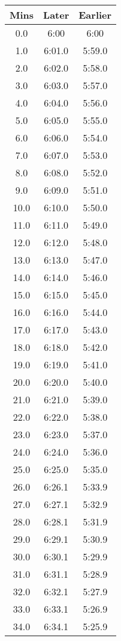 \begin{footnotesize}
	\begin{minipage}{0.25\textwidth}	
\begin{tabular}[t]{c|c|c}
	Mins&Later&Earlier\\\hline
	0.0&6:00&6:00\\\hline
	1.0&6:01.0&5:59.0\\\hline
	2.0&6:02.0&5:58.0\\\hline
	3.0&6:03.0&5:57.0\\\hline
	4.0&6:04.0&5:56.0\\\hline
	5.0&6:05.0&5:55.0\\\hline
	6.0&6:06.0&5:54.0\\\hline
	7.0&6:07.0&5:53.0\\\hline
	8.0&6:08.0&5:52.0\\\hline
	9.0&6:09.0&5:51.0\\\hline
	10.0&6:10.0&5:50.0\\\hline
	11.0&6:11.0&5:49.0\\\hline
	12.0&6:12.0&5:48.0\\\hline
	13.0&6:13.0&5:47.0\\\hline
	14.0&6:14.0&5:46.0\\\hline
	15.0&6:15.0&5:45.0\\\hline
	16.0&6:16.0&5:44.0\\\hline
	17.0&6:17.0&5:43.0\\\hline
	18.0&6:18.0&5:42.0\\\hline
	19.0&6:19.0&5:41.0\\\hline
	20.0&6:20.0&5:40.0\\\hline
	21.0&6:21.0&5:39.0\\\hline
	22.0&6:22.0&5:38.0\\\hline
	23.0&6:23.0&5:37.0\\\hline
	24.0&6:24.0&5:36.0\\\hline
	25.0&6:25.0&5:35.0\\\hline
	26.0&6:26.1&5:33.9\\\hline
	27.0&6:27.1&5:32.9\\\hline
	28.0&6:28.1&5:31.9\\\hline
	29.0&6:29.1&5:30.9\\\hline
	30.0&6:30.1&5:29.9\\\hline
	31.0&6:31.1&5:28.9\\\hline
	32.0&6:32.1&5:27.9\\\hline
	33.0&6:33.1&5:26.9\\\hline
	34.0&6:34.1&5:25.9\\\hline

\end{tabular}
\end{minipage}
\end{footnotesize}
